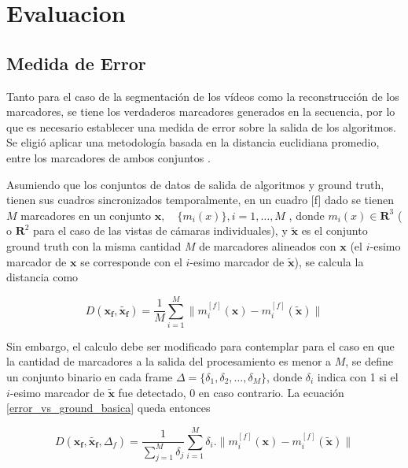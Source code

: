 \section{Evaluacion}

\subsection{Medida de Error}

Tanto para el caso de la segmentación de los vídeos como la reconstrucción de los marcadores, se tiene los verdaderos marcadores generados en la secuencia, por lo que es necesario establecer una medida de error sobre la salida de los algoritmos. Se eligió aplicar una metodología basada en la distancia euclidiana promedio, entre los marcadores de ambos conjuntos \cite{humaneva} . 

Asumiendo que los conjuntos de datos de salida de algoritmos y ground truth, tienen sus cuadros sincronizados temporalmente, en un cuadro [f] dado se tienen $M$ marcadores en un conjunto $ \boldsymbol{x},\quad\{m_{i}(x)\},i=1,\ldots,M $ , donde $ m_{i}(x)\in{\mathbf{R}^{3}} $ ( o $ \mathbf{R}^{2} $ para el caso de las vistas de cámaras individuales), y $ \boldsymbol{\tilde{x}} $ es el conjunto ground truth con la misma cantidad $M$ de marcadores alineados con $\boldsymbol{x}$ (el $i$-esimo marcador de $\boldsymbol{x}$ se corresponde con el  $i$-esimo marcador de $\boldsymbol{\tilde{x}}$), se calcula la distancia como

\begin{equation}
D(\boldsymbol{x_{f}},\boldsymbol{\tilde{x_{f}}})=\frac{1}{M}\sum_{i=1}^{M} \|m_{i}^{[f]}(\boldsymbol{x})-m_{i}^{[f]}(\boldsymbol{\tilde{x}})\|
\label{error_vs_ground_basica}
\end{equation}

Sin embargo, el calculo debe ser modificado para contemplar para el caso en que la cantidad de marcadores a la salida del procesamiento es menor a $M$, se define un conjunto binario en cada frame $\Delta=\{\delta_1,\delta_2,\ldots,\delta_M\}$, donde $\delta_i$ indica con 1 si el $i$-esimo marcador de $\boldsymbol{\tilde{x}}$ fue detectado, 0 en caso contrario. La ecuación \ref{error_vs_ground_basica} queda entonces

\begin{equation}
D(\boldsymbol{x_{f}},\boldsymbol{\tilde{x_{f}}},\Delta_{f})=\frac{1}{\sum_{j=1}^{M} \delta_j} \sum_{i=1}^{M} \delta_i.\|m_{i}^{[f]}(\boldsymbol{x})-m_{i}^{[f]}(\boldsymbol{\tilde{x}})\|
\label{error_vs_ground_deteccion}
\end{equation}

